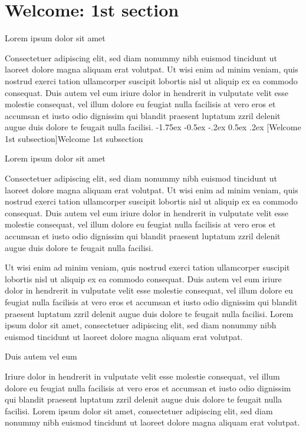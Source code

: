 \documentclass[11pt,twoside]{article}\makeatletter
\makeatletter
\renewcommand\section{\@startsection {section}{1}{\z@}%
     {-1.75ex \@plus -0.5ex \@minus -.2ex}%
     {0.5ex \@plus .2ex}%
     {\reset@font\Large\bfseries\sffamily}}
\renewcommand\subsection{\@startsection{subsection}{2}{\z@}%
     {-1.75ex\@plus -0.5ex \@minus- .2ex}%
     {0.5ex \@plus .2ex}%
     {\reset@font\Large\sffamily}}
\def\DivI{\section}
\def\DivII{\subsection}
\def\DivI{\chapter}
\def\DivII{\section}
\makeatother
\begin{document}
\DivI[Welcome: 1st section]{Welcome: 1st section}\label{part1}\par
Lorem ipsum dolor sit amet\par
Consectetuer adipiscing elit, sed diam nonummy nibh euismod       tincidunt ut laoreet dolore magna aliquam erat volutpat. Ut wisi enim       ad minim veniam, quis nostrud exerci tation ullamcorper suscipit       lobortis nisl ut aliquip ex ea commodo consequat. Duis autem vel eum       iriure dolor in hendrerit in vulputate velit esse molestie consequat,       vel illum dolore eu feugiat nulla facilisis at vero eros et accumsan       et iusto odio dignissim qui blandit praesent luptatum zzril delenit       augue duis dolore te feugait nulla facilisi.
\DivII[Welcome 1st subsection]{Welcome 1st subsection}\par
Lorem ipsum dolor sit amet\par
Consectetuer adipiscing elit, sed diam nonummy nibh euismod       tincidunt ut laoreet dolore magna aliquam erat volutpat. Ut wisi enim       ad minim veniam, quis nostrud exerci tation ullamcorper suscipit       lobortis nisl ut aliquip ex ea commodo consequat. Duis autem vel eum       iriure dolor in hendrerit in vulputate velit esse molestie consequat,       vel illum dolore eu feugiat nulla facilisis at vero eros et accumsan       et iusto odio dignissim qui blandit praesent luptatum zzril delenit       augue duis dolore te feugait nulla facilisi.\par
Ut wisi enim ad minim veniam, quis nostrud exerci tation       ullamcorper suscipit lobortis nisl ut aliquip ex ea commodo       consequat. Duis autem vel eum iriure dolor in hendrerit in vulputate       velit esse molestie consequat, vel illum dolore eu feugiat nulla       facilisis at vero eros et accumsan et iusto odio dignissim qui blandit       praesent luptatum zzril delenit augue duis dolore te feugait nulla       facilisi. Lorem ipsum dolor sit amet, consectetuer adipiscing elit,       sed diam nonummy nibh euismod tincidunt ut laoreet dolore magna       aliquam erat volutpat. \par
Duis autem vel eum \par
Iriure dolor in hendrerit in vulputate velit esse molestie       consequat, vel illum dolore eu feugiat nulla facilisis at vero eros et       accumsan et iusto odio dignissim qui blandit praesent luptatum zzril       delenit augue duis dolore te feugait nulla facilisi. Lorem ipsum dolor       sit amet, consectetuer adipiscing elit, sed diam nonummy nibh euismod       tincidunt ut laoreet dolore magna aliquam erat volutpat. \par
\end{document}
